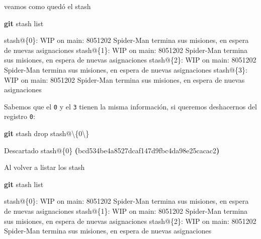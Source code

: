 \documentclass[
]{book}
\newenvironment{Shaded}{\begin{snugshade}}{\end{snugshade}}
\newcommand{\DataTypeTok}[1]{\textcolor[rgb]{0.13,0.29,0.53}{#1}}
\newcommand{\ErrorTok}[1]{\textcolor[rgb]{0.64,0.00,0.00}{\textbf{#1}}}
\newcommand{\ExtensionTok}[1]{#1}
\newcommand{\FunctionTok}[1]{\textcolor[rgb]{0.13,0.29,0.53}{\textbf{#1}}}
\newcommand{\KeywordTok}[1]{\textcolor[rgb]{0.13,0.29,0.53}{\textbf{#1}}}
\newcommand{\NormalTok}[1]{#1}
\begin{document}
veamos como quedó el stash

\begin{Shaded}
\begin{Highlighting}[]
\FunctionTok{git}\NormalTok{ stash list}
\end{Highlighting}
\end{Shaded}

\begin{Shaded}
\begin{Highlighting}[]
\ExtensionTok{stash@\{0\}:}\NormalTok{ WIP on main: 8051202 Spider{-}Man termina sus misiones, en espera de nuevas asignaciones}
\ExtensionTok{stash@\{1\}:}\NormalTok{ WIP on main: 8051202 Spider{-}Man termina sus misiones, en espera de nuevas asignaciones}
\ExtensionTok{stash@\{2\}:}\NormalTok{ WIP on main: 8051202 Spider{-}Man termina sus misiones, en espera de nuevas asignaciones}
\ExtensionTok{stash@\{3\}:}\NormalTok{ WIP on main: 8051202 Spider{-}Man termina sus misiones, en espera de nuevas asignaciones}
\end{Highlighting}
\end{Shaded}

Sabemos que el \texttt{0} y el \texttt{3} tienen la misma información, si queremos deshacernos del registro \texttt{0}:

\begin{Shaded}
\begin{Highlighting}[]
\FunctionTok{git}\NormalTok{ stash drop stash@}\DataTypeTok{\textbackslash{}\{}\NormalTok{0}\DataTypeTok{\textbackslash{}\}}
\end{Highlighting}
\end{Shaded}

\begin{Shaded}
\begin{Highlighting}[]
\ExtensionTok{Descartado}\NormalTok{ stash@\{0\} }\ErrorTok{(}\ExtensionTok{bcd534be4a8527dcaf147d9fbc4da98e25cacac2}\KeywordTok{)}
\end{Highlighting}
\end{Shaded}

Al volver a listar los stash

\begin{Shaded}
\begin{Highlighting}[]
\FunctionTok{git}\NormalTok{ stash list}
\end{Highlighting}
\end{Shaded}

\begin{Shaded}
\begin{Highlighting}[]
\ExtensionTok{stash@\{0\}:}\NormalTok{ WIP on main: 8051202 Spider{-}Man termina sus misiones, en espera de nuevas asignaciones}
\ExtensionTok{stash@\{1\}:}\NormalTok{ WIP on main: 8051202 Spider{-}Man termina sus misiones, en espera de nuevas asignaciones}
\ExtensionTok{stash@\{2\}:}\NormalTok{ WIP on main: 8051202 Spider{-}Man termina sus misiones, en espera de nuevas asignaciones}
\end{Highlighting}
\end{Shaded}
\end{document}

